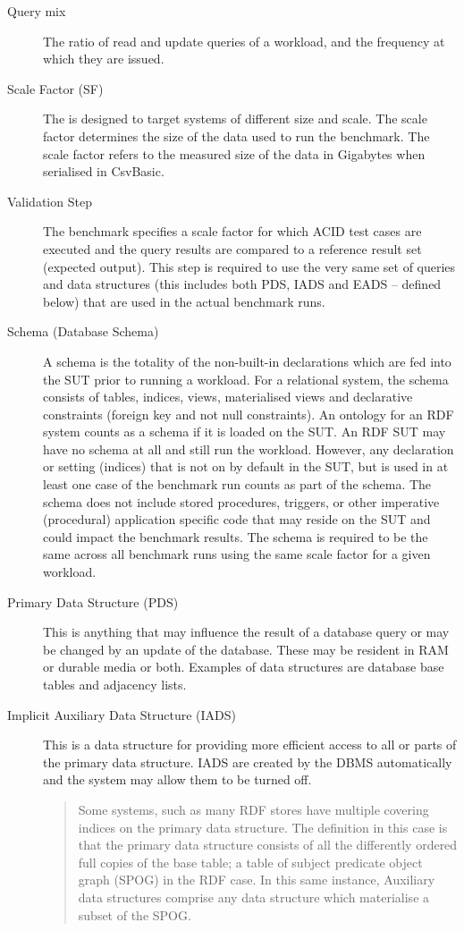 \begin{description}
    \item[Query mix] The ratio of read and update queries of a workload, and the frequency at which they are issued.
    
    \item[Scale Factor (SF)] The \ldbcsnb is designed to target systems of different size and scale. The scale factor determines the size of the data used to run the benchmark. The scale factor refers to the measured size of the data in Gigabytes when serialised in CsvBasic.

    \item[Validation Step] The benchmark specifies a scale factor for which ACID test cases are executed and the query results are compared to a reference result set (\ie expected output). This step is required to use the very same set of queries and data structures (this includes both PDS, IADS and EADS -- defined below) that are used in the actual benchmark runs. 
    
    \item[Schema (Database Schema)] A schema is the totality of the non-built-in declarations which are fed into the SUT prior to running a workload. For a relational system, the schema consists of tables, indices, views, materialised views and declarative constraints (\eg foreign key and not null constraints). An ontology for an RDF system counts as a schema if it is loaded on the SUT. An RDF SUT may have no schema at all and still run the workload. However, any declaration or setting (\eg indices) that is not on by default in the SUT, but is used in at least one case of the benchmark run counts as part of the schema.
    The schema does not include stored procedures, triggers, or other imperative (procedural) application specific code that may reside on the SUT and could impact the benchmark results. The schema is required to be the same across all benchmark runs using the same scale factor for a given workload.

    \item[Primary Data Structure (PDS)] 
    This is anything that may influence the result of a database query or may be changed by an update of the database. These may be resident in RAM or durable media or both. Examples of data structures are database base tables and adjacency lists.

    \item[Implicit Auxiliary Data Structure (IADS)] This is a data structure for providing more efficient access to all or parts of the primary data structure. IADS are created by the DBMS automatically and the system may allow them to be turned off. 
    \begin{quote}
        Some systems, such as many RDF stores have multiple covering indices on the primary data structure. The definition in this case is that the primary data structure consists of all the differently ordered full copies of the base table; a table of subject predicate object graph (SPOG) in the RDF case. In this same instance, Auxiliary data structures comprise any data structure which materialise a subset of the SPOG.    
    \end{quote}
    

\end{description}
